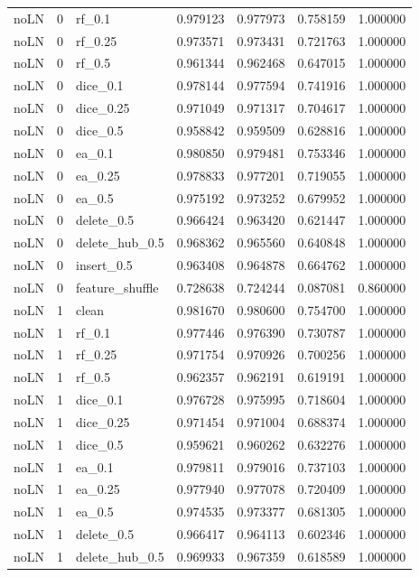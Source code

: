 \documentclass[UTF8,a4paper,11pt,fontset=fandol]{ctexart}
\begin{document}
{\begin{longtable}{lrlrrrr}
noLN & 0 & rf\_0.1 & 0.979123 & 0.977973 & 0.758159 & 1.000000 \\
noLN & 0 & rf\_0.25 & 0.973571 & 0.973431 & 0.721763 & 1.000000 \\
noLN & 0 & rf\_0.5 & 0.961344 & 0.962468 & 0.647015 & 1.000000 \\
noLN & 0 & dice\_0.1 & 0.978144 & 0.977594 & 0.741916 & 1.000000 \\
noLN & 0 & dice\_0.25 & 0.971049 & 0.971317 & 0.704617 & 1.000000 \\
noLN & 0 & dice\_0.5 & 0.958842 & 0.959509 & 0.628816 & 1.000000 \\
noLN & 0 & ea\_0.1 & 0.980850 & 0.979481 & 0.753346 & 1.000000 \\
noLN & 0 & ea\_0.25 & 0.978833 & 0.977201 & 0.719055 & 1.000000 \\
noLN & 0 & ea\_0.5 & 0.975192 & 0.973252 & 0.679952 & 1.000000 \\
noLN & 0 & delete\_0.5 & 0.966424 & 0.963420 & 0.621447 & 1.000000 \\
noLN & 0 & delete\_hub\_0.5 & 0.968362 & 0.965560 & 0.640848 & 1.000000 \\
noLN & 0 & insert\_0.5 & 0.963408 & 0.964878 & 0.664762 & 1.000000 \\
noLN & 0 & feature\_shuffle & 0.728638 & 0.724244 & 0.087081 & 0.860000 \\
noLN & 1 & clean & 0.981670 & 0.980600 & 0.754700 & 1.000000 \\
noLN & 1 & rf\_0.1 & 0.977446 & 0.976390 & 0.730787 & 1.000000 \\
noLN & 1 & rf\_0.25 & 0.971754 & 0.970926 & 0.700256 & 1.000000 \\
noLN & 1 & rf\_0.5 & 0.962357 & 0.962191 & 0.619191 & 1.000000 \\
noLN & 1 & dice\_0.1 & 0.976728 & 0.975995 & 0.718604 & 1.000000 \\
noLN & 1 & dice\_0.25 & 0.971454 & 0.971004 & 0.688374 & 1.000000 \\
noLN & 1 & dice\_0.5 & 0.959621 & 0.960262 & 0.632276 & 1.000000 \\
noLN & 1 & ea\_0.1 & 0.979811 & 0.979016 & 0.737103 & 1.000000 \\
noLN & 1 & ea\_0.25 & 0.977940 & 0.977078 & 0.720409 & 1.000000 \\
noLN & 1 & ea\_0.5 & 0.974535 & 0.973377 & 0.681305 & 1.000000 \\
noLN & 1 & delete\_0.5 & 0.966417 & 0.964113 & 0.602346 & 1.000000 \\
noLN & 1 & delete\_hub\_0.5 & 0.969933 & 0.967359 & 0.618589 & 1.000000 \\

\end{longtable}}
\end{document}
